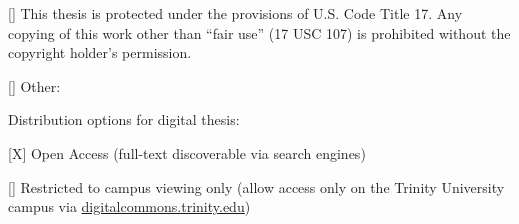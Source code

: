 \begin{singlespace}
\begin{small}
\begin{TitlePageList}
\item{[\hspace*{\WidthOfX}]}
This thesis is protected under the provisions of U.S. Code Title 17.
Any copying of this work other than ``fair use'' (17 USC 107)
is prohibited without the copyright holder’s permission.

\item{[\hspace*{\WidthOfX}]}
Other:

\end{TitlePageList}

\vspace*{2\baselineskip}

\noindent
Distribution options for digital thesis:

\begin{TitlePageList}

\item{[X]}
Open Access (full-text discoverable via search engines)

\item{[\hspace*{\WidthOfX}]}
Restricted to campus viewing only (allow access only on the Trinity
University campus via \url{digitalcommons.trinity.edu})

\end{TitlePageList}

\end{small}

\end{singlespace}
